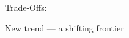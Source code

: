 \documentclass[
    xcolor={svgnames,dvipsnames},
    hyperref={colorlinks, citecolor=DeepPink4, linkcolor=DarkRed, urlcolor=DarkBlue}
    ]{beamer}  %
\newcommand{\1}{\mathbbm 1}
\begin{document}
\begin{frame}

    Trade-Offs:

    \begin{figure}
       \begin{center}
       \end{center}
    \end{figure}

\end{frame}



\begin{frame}[fragile]

    New trend --- a shifting frontier

\end{frame}
\end{document}
